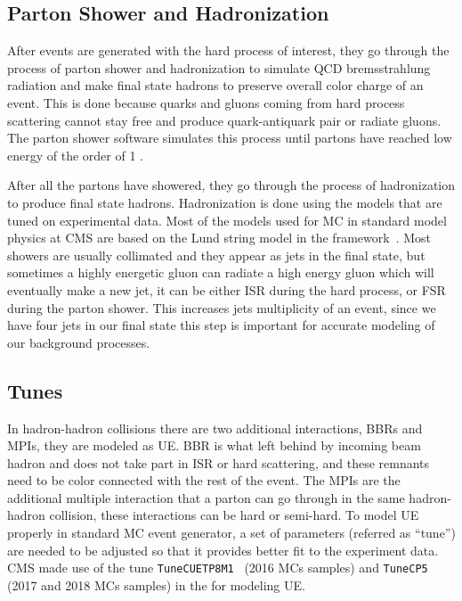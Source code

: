 \subsection{
  Parton Shower and Hadronization
}

After events are generated with the hard process of interest,
they go through the process of parton shower and hadronization
to simulate QCD bremsstrahlung radiation
and make final state hadrons to preserve overall color charge of an event.
This is done because quarks and gluons coming from hard process scattering
cannot stay free and produce quark-antiquark pair
or radiate gluons.
The parton shower software simulates this process until partons
have reached low energy of the order of 1 \GeV{}.

After all the partons have showered, they go through the process of
hadronization to produce final state hadrons.
Hadronization is done using the models that are tuned on experimental data.
Most of the models used for \gls{MC} in standard model physics at \gls{CMS}
are based on the Lund string model in the \PYTHIA{} framework~\cite{pythia}.
Most showers are usually collimated and they appear
as jets in the final state, but sometimes a highly energetic gluon
can radiate a high energy gluon which will eventually
make a new jet, it can be either \gls{ISR} during the hard process,
or \gls{FSR} during the parton shower.
This increases jets multiplicity of an event,
since we have four jets in our final state this step is important for
accurate modeling of our background processes.

\subsection{Tunes}

In hadron-hadron collisions there are two additional interactions,
\glspl{BBR} and \glspl{MPI}, they are modeled as \gls{UE}.
\gls{BBR} is what left behind by incoming beam hadron and does
not take part in \gls{ISR} or hard scattering, and these remnants
need to be color connected with the rest of the event.
The \glspl{MPI} are the additional multiple interaction that a parton
can go through in the same hadron-hadron collision,
these interactions can be hard or semi-hard.
To model \gls{UE} properly in standard \gls{MC} event generator,
a set of parameters (referred as ``tune'') are needed
to be adjusted so that it provides better fit to the experiment data.
\gls{CMS} made use of the tune \texttt{TuneCUETP8M1}~\cite{pythia8-tune-CUETP8M1}
(2016 \glspl{MC} samples) and \texttt{TuneCP5}~\cite{pythia8-tune-cp5} (2017 and 2018 \glspl{MC} samples)
in the \PYTHIA{} for modeling \gls{UE}.